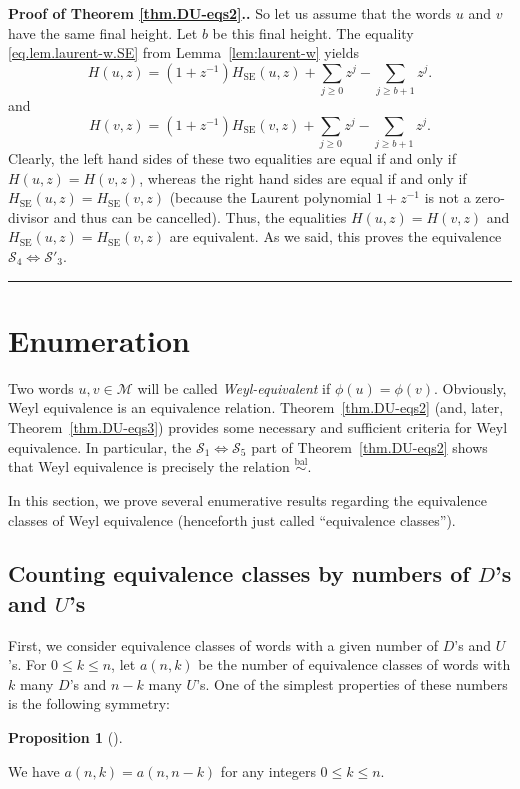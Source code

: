 \documentclass[numbers=enddot,12pt,final,onecolumn,notitlepage]{scrartcl}%
\theoremstyle{definition}
\newtheorem{prop}[theo]{Proposition}
\newenvironment{proposition}[1][]
{\begin{prop}[#1]\begin{leftbar}}
{\end{leftbar}\end{prop}}
\newenvironment{proof}[1][Proof]{\noindent\textbf{#1.} }{\ \rule{0.5em}{0.5em}}
\newcommand{\M}{\mathcal{M}}
\newcommand{\SE}{\operatorname{SE}}
\newcommand{\balsim}{\overset{\operatorname*{bal}}{\sim}}
\newcommand{\tup}[1]{\left( #1 \right)}
\begin{document}
\begin{proof}[Proof of Theorem \ref{thm.DU-eqs2}.]
So let us assume that the words $u$ and $v$ have the same final height.
Let $b$ be this final height.
The equality \eqref{eq.lem.laurent-w.SE} from Lemma~\ref{lem:laurent-w} yields
\[
H(u,z) = (1+z^{-1})H_{\SE}(u,z) + \sum_{j \geq 0} z^j - \sum_{j \geq b+1} z^j.
\]
and
\[
H(v,z) = (1+z^{-1})H_{\SE}(v,z) + \sum_{j \geq 0} z^j - \sum_{j \geq b+1} z^j.
\]
Clearly, the left hand sides of these two equalities are equal
if and only if $H\tup{u, z} = H\tup{v, z}$, whereas the right
hand sides are equal if and only if
$H_{\SE} \tup{u, z} = H_{\SE} \tup{v, z}$ (because the Laurent
polynomial $1 + z^{-1}$ is not a zero-divisor and thus can be cancelled).
Thus, the equalities $H\tup{u, z} = H\tup{v, z}$
and $H_{\SE} \tup{u, z} = H_{\SE} \tup{v, z}$ are equivalent.
As we said, this proves the equivalence
$\mathcal{S}_4 \Longleftrightarrow \mathcal{S}'_3$.
\end{proof}

\section{Enumeration}\label{sec:enum}

Two words $u, v \in \M$ will be called \emph{Weyl-equivalent} if $\phi\tup{u} = \phi\tup{v}$. Obviously, Weyl equivalence is an equivalence relation.
Theorem~\ref{thm.DU-eqs2} (and, later, Theorem~\ref{thm.DU-eqs3}) provides some necessary and sufficient criteria for Weyl equivalence.
In particular, the $\mathcal{S}_1 \Longleftrightarrow \mathcal{S}_5$ part of Theorem~\ref{thm.DU-eqs2} shows that Weyl equivalence is precisely the relation $\balsim$.

In this section, we prove several enumerative results regarding the equivalence classes of Weyl equivalence (henceforth just called ``equivalence classes'').

\subsection{Counting equivalence classes by numbers of $D$'s and $U$'s}

First, we consider equivalence classes of words with a given number of $D$'s and $U$'s. For $0 \leq k \leq n$, let $a(n,k)$ be the number of equivalence classes of words with $k$ many $D$'s and $n-k$ many $U$'s.
One of the simplest properties of these numbers is the following symmetry:

\begin{proposition}
    \label{prop.a.sym}
    We have $a(n, k) = a(n, n-k)$ for any integers $0 \leq k \leq n$.
\end{proposition}
\end{document}

